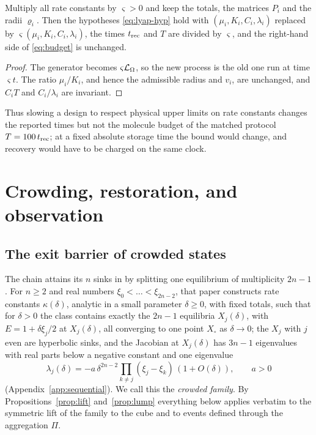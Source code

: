 \begin{proposition}\label{prop:clock}
Multiply all rate constants by \(\varsigma>0\) and keep the totals, the matrices \(P_i\) and
the radii \(\varrho_i\). Then the hypotheses \eqref{eq:lyap-hyp} hold with
\((\mu_i,K_i,C_i,\lambda_i)\) replaced by \(\varsigma(\mu_i,K_i,C_i,\lambda_i)\), the times
\(t_{\mathrm{rec}}\) and \(T\) are divided by \(\varsigma\), and the right-hand side of \eqref{eq:budget}
is unchanged.
\end{proposition}
\begin{proof}
The generator becomes \(\varsigma\mathcal L_\Omega\), so the new process is the old one run at time
\(\varsigma t\). The ratio \(\mu_i/K_i\), and hence the admissible radius and \(v_i\), are
unchanged, and \(C_iT\) and \(C_i/\lambda_i\) are invariant.
\end{proof}
Thus slowing a design to respect physical upper limits on rate constants changes the reported
times but not the molecule budget of the matched protocol \(T=100\,t_{\mathrm{rec}}\); at a fixed absolute
storage time the bound would change, and recovery would have to be charged on the same clock.

\section{Crowding, restoration, and observation}\label{sec:crowding}

\subsection{The exit barrier of crowded states}
The chain attains its \(n\) sinks in \cite{Companion} by splitting one equilibrium of
multiplicity \(2n-1\). For \(n\ge2\) and real numbers \(\xi_0<\dots<\xi_{2n-2}\), that paper
constructs rate constants \(\kappa(\delta)\), analytic in a small parameter \(\delta\ge0\),
with fixed totals, such that for \(\delta>0\) the class contains exactly the \(2n-1\)
equilibria \(X_j(\delta)\), with \(E=1+\delta\xi_j/2\) at \(X_j(\delta)\), all converging to
one point \(X_\circ\) as \(\delta\to0\); the \(X_j\) with \(j\) even are hyperbolic sinks, and
the Jacobian at \(X_j(\delta)\) has \(3n-1\) eigenvalues with real parts below a negative
constant and one eigenvalue
\begin{equation}\label{eq:split}
 \lambda_j(\delta)=-a\,\delta^{2n-2}\prod_{k\ne j}(\xi_j-\xi_k)\,(1+O(\delta)),\qquad a>0
\end{equation}
(Appendix~\ref{app:sequential}). We call this the \emph{crowded family}. By
Propositions~\ref{prop:lift} and~\ref{prop:lump} everything below applies verbatim to the
symmetric lift of the family to the cube and to events defined through the aggregation
\(\Pi\).

